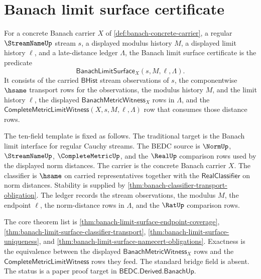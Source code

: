 \section{Banach limit surface certificate}
\label{sec:banach-limit-surface-certificate}

\begin{definition}
\label{def:banach-limit-surface-certificate}
For a concrete Banach carrier $X$ of
\autoref{def:banach-concrete-carrier}, a regular $\StreamNameUp$ stream $s$,
a displayed modulus history $M$, a displayed limit history $\ell$, and a
late-distance ledger $\Lambda$, the Banach limit surface certificate is the
predicate
$$
\mathsf{BanachLimitSurface}_X(s,M,\ell,\Lambda).
$$
It consists of the carried $\mathsf{BHist}$ stream observations of $s$, the
componentwise $\hsame$ transport rows for the observations, the modulus
history $M$, and the limit history $\ell$, the displayed
$\mathsf{BanachMetricWitness}_X$ rows in $\Lambda$, and the
$\mathsf{CompleteMetricLimitWitness}(X,s,M,\ell,\Lambda)$ row that consumes
those distance rows.

The ten-field template is fixed as follows. The traditional target is the
Banach limit interface for regular Cauchy streams. The BEDC source is
$\NormUp$, $\StreamNameUp$, $\CompleteMetricUp$, and the $\RealUp$ comparison
rows used by the displayed norm distances. The carrier is the concrete Banach
carrier $X$. The classifier is $\hsame$ on carried representatives together
with the $\mathsf{RealClassifier}$ on norm distances. Stability is supplied by
\autoref{thm:banach-classifier-transport-obligation}. The ledger records the
stream observations, the modulus $M$, the endpoint $\ell$, the norm-distance
rows in $\Lambda$, and the $\RatUp$ comparison rows.

The core theorem list is
\autoref{thm:banach-limit-surface-endpoint-coverage},
\autoref{thm:banach-limit-surface-classifier-transport},
\autoref{thm:banach-limit-surface-uniqueness}, and
\autoref{thm:banach-limit-surface-namecert-obligations}. Exactness is the
equivalence between the displayed $\mathsf{BanachMetricWitness}_X$ rows and
the $\mathsf{CompleteMetricLimitWitness}$ rows they feed. The standard bridge
field is absent. The status is a paper proof target in
$\mathsf{BEDC.Derived.BanachUp}$.
\end{definition}

